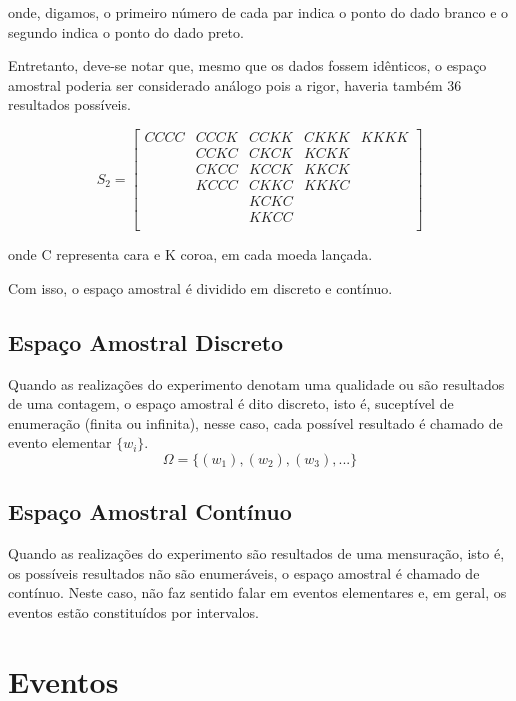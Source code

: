 onde, digamos, o primeiro número de cada par indica o ponto do
dado branco e o segundo indica o ponto do dado preto.\vskip0.3cm

Entretanto, deve-se notar que, mesmo que os dados fossem
idênticos, o espaço amostral poderia ser considerado análogo pois
a rigor, haveria também 36 resultados possíveis.


$$
S_{2} =
\left[%
\begin{array}{ccccc}
  CCCC  & CCCK  & CCKK  & CKKK  & KKKK \\
        & CCKC  & CKCK  & KCKK  &      \\
        & CKCC  & KCCK  & KKCK  &      \\
        & KCCC  & CKKC  & KKKC  &      \\
        &       & KCKC  &       &      \\
        &       & KKCC  &       &      \\
\end{array}%
\right]
$$

onde C representa cara e K coroa, em cada moeda
lançada.\vskip0.3cm

Com isso, o espaço amostral é dividido em discreto e contínuo.


\subsection{Espaço Amostral Discreto}

Quando as realizações do experimento denotam uma qualidade ou são
resultados de uma contagem, o espaço amostral é dito discreto,
isto é, suceptível de enumeração (finita ou infinita), nesse caso,
cada possível resultado é chamado de evento elementar $\{w_{i}\}$.
$$ \Omega = \{ (w_{1}),(w_{2}),(w_{3}),... \}  $$


\subsection{Espaço Amostral Contínuo}

Quando as realizações do experimento são resultados de uma
mensuração, isto é, os possíveis resultados não são enumeráveis, o
espaço amostral é chamado de contínuo. Neste caso, não faz sentido
falar em eventos elementares e, em geral, os eventos estão
constituídos por intervalos.


\section{Eventos}

